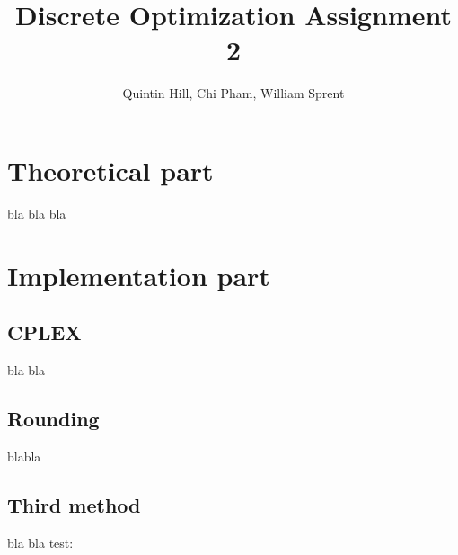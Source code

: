 \documentclass[11pt,a4paper,english]{article}
\begin{document}
\title{Discrete Optimization Assignment 2}
\author{Quintin Hill, Chi Pham, William Sprent}
\maketitle
\tableofcontents
\clearpage

\section{Theoretical part}
bla bla bla
\clearpage

\section{Implementation part}

\subsection{CPLEX}
bla bla

\subsection{Rounding}
blabla

\subsection{Third method}
bla bla
test: \cite{Wolsey}

\clearpage


\end{document}
